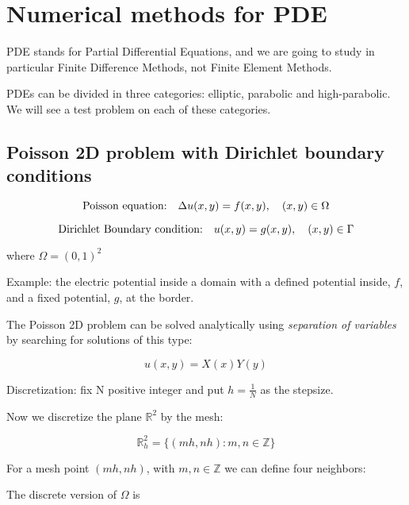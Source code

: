 \chapter{Numerical methods for PDE}

PDE stands for Partial Differential Equations, and we are going to study in particular Finite Difference Methods, not Finite Element Methods.

PDEs can be divided in three categories: elliptic, parabolic and high-parabolic. We will see a test problem on each of these categories.

\section{Poisson 2D problem with Dirichlet boundary conditions}
\begin{equation}
\text{Poisson equation:\quad} \Delta u(x, y) = f(x, y), \quad (x, y) \in \Omega
\end{equation}

\begin{equation}
\text{Dirichlet Boundary condition:\quad} u(x, y) = g(x, y), \quad (x, y) \in \Gamma
\end{equation}

where $\Omega = (0, 1)^2$


Example: the electric potential inside a domain with a defined potential inside, $f$, and a fixed potential, $g$, at the border.

The Poisson 2D problem can be solved analytically using \textit{separation of variables} by searching for solutions of this type:

\begin{equation}
	u(x, y) = X(x) Y(y)
\end{equation}

Discretization: fix N positive integer and put $h = \frac{1}{N}$ as the stepsize.

Now we discretize the plane $\mathbb{R}^2$ by the mesh:

\begin{equation}
	\mathbb{R}^2_h = \{(mh, nh): m,n \in \mathbb{Z}\}
\end{equation}


For a mesh point $(mh, nh)$, with $m, n \in \mathbb{Z}$ we can define four neighbors:


The discrete version of $\Omega$ is


